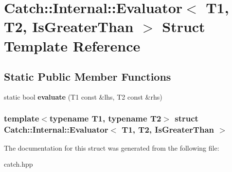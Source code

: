 \hypertarget{structCatch_1_1Internal_1_1Evaluator_3_01T1_00_01T2_00_01IsGreaterThan_01_4}{
\section{Catch::Internal::Evaluator$<$ T1, T2, IsGreaterThan $>$ Struct Template Reference}
\label{structCatch_1_1Internal_1_1Evaluator_3_01T1_00_01T2_00_01IsGreaterThan_01_4}
}
\subsection*{Static Public Member Functions}
\begin{DoxyCompactItemize}
\item 
\hypertarget{structCatch_1_1Internal_1_1Evaluator_3_01T1_00_01T2_00_01IsGreaterThan_01_4_a55745f74f09ac5c61bd3d592ca5560af}{
static bool {\bfseries evaluate} (T1 const \&lhs, T2 const \&rhs)}
\label{structCatch_1_1Internal_1_1Evaluator_3_01T1_00_01T2_00_01IsGreaterThan_01_4_a55745f74f09ac5c61bd3d592ca5560af}

\end{DoxyCompactItemize}
\subsubsection*{template$<$typename T1, typename T2$>$ struct Catch::Internal::Evaluator$<$ T1, T2, IsGreaterThan $>$}



The documentation for this struct was generated from the following file:\begin{DoxyCompactItemize}
\item 
catch.hpp\end{DoxyCompactItemize}
